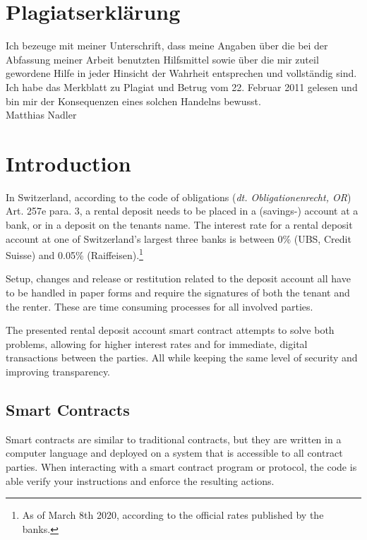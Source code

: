 \documentclass[12pt,a4paper,titlepage,oneside,english]{article}
\begin{document}
\section*{Plagiatserklärung}
Ich bezeuge mit meiner Unterschrift, dass meine Angaben über die bei der Abfassung meiner Arbeit benutzten Hilfsmittel sowie über die mir zuteil gewordene Hilfe in jeder Hinsicht der Wahrheit entsprechen und vollständig sind. Ich habe das Merkblatt zu Plagiat und Betrug vom 22. Februar 2011 gelesen und bin mir der Konsequenzen eines solchen Handelns bewusst.\\

Matthias Nadler

\newpage
\onehalfspacing
{}



\section{Introduction}
\label{sec:introduction}
In Switzerland, according to the code of obligations (\textit{dt. Obligationenrecht, OR})  Art. 257e para. 3, a rental deposit needs to be placed in a (savings-) account at a bank, or in a deposit on the tenants name. The interest rate for a rental deposit account at one of Switzerland's largest three banks is between 0\% (UBS, Credit Suisse) and 0.05\% (Raiffeisen).\footnote{As of March 8th 2020, according to the official rates published by the banks.}

Setup, changes and release or restitution related to the deposit account all have to be handled in paper forms and require the signatures of both the tenant and the renter. These are time consuming processes for all involved parties.

The presented rental deposit account smart contract attempts to solve both problems, allowing for higher interest rates and for immediate, digital transactions between the parties. All while keeping the same level of security and improving transparency. 

\subsection{Smart Contracts}
\label{sub:smart-contracts}
Smart contracts are similar to traditional contracts, but they are written in a computer language and deployed on a system that is accessible to all contract parties. When interacting with a smart contract program or protocol, the code is able verify your instructions and enforce the resulting actions.
\end{document}
